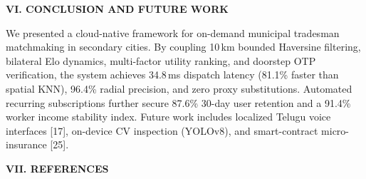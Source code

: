 \documentclass[10pt,twocolumn,a4paper]{article}
\begin{document}
\vspace{0.3em}
\noindent
\textbf{\large VI. CONCLUSION AND FUTURE WORK}

\vspace{0.2em}
We presented a cloud-native framework for on-demand municipal tradesman matchmaking in secondary cities. By coupling 10\,km bounded Haversine filtering, bilateral Elo dynamics, multi-factor utility ranking, and doorstep OTP verification, the system achieves 34.8\,ms dispatch latency (81.1\% faster than spatial KNN), 96.4\% radial precision, and zero proxy substitutions. Automated recurring subscriptions further secure 87.6\% 30-day user retention and a 91.4\% worker income stability index. Future work includes localized Telugu voice interfaces [17], on-device CV inspection (YOLOv8), and smart-contract micro-insurance [25].

\vspace{0.3em}
\noindent
\textbf{\large VII. REFERENCES}
\end{document}
